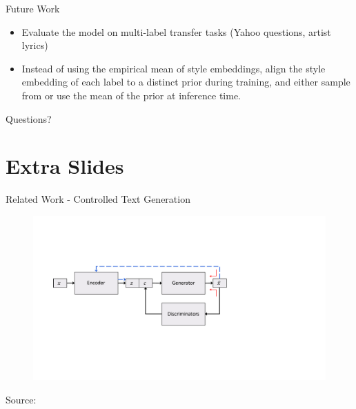 \documentclass[aspectratio=169]{beamer}
\newcommand{\imgsrc}[1]{\tiny{Source: #1}}
\begin{document}
% 

\begin{frame}{Future Work}
	\begin{itemize}
		\item Evaluate the model on multi-label transfer tasks (Yahoo questions, artist lyrics)
		\item Instead of using the empirical mean of style embeddings, align the style embedding of each label to a distinct prior during training, and either sample from or use the mean of the prior at inference time.
	\end{itemize}
\end{frame}

% 

\begin{frame}[allowframebreaks]
	
	
\end{frame}

% 

\begin{frame}
	\centering
	\Huge{Questions?}
\end{frame}

% 

\section{Extra Slides}

\begin{frame}{Related Work - Controlled Text Generation}
	\centering
	\begin{figure}[ht]
		\includegraphics[width=\textwidth]{images/tcg-architecture}
	\end{figure}
	\imgsrc{\citet{hu2017toward}}
\end{frame}
\end{document}
